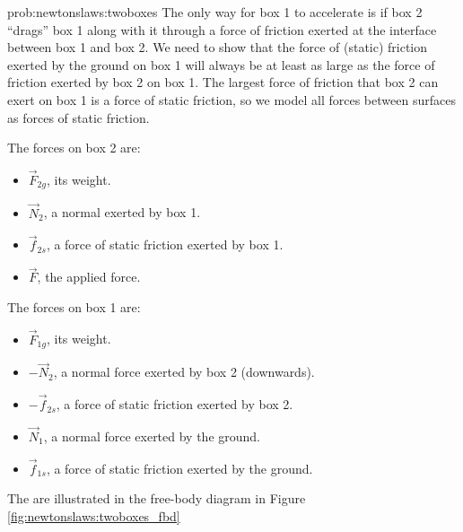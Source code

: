 \begin{solution}{prob:newtonslaws:twoboxes}\label{soln:newtonslaws:twoboxes}
The only way for box 1 to accelerate is if box 2 ``drags'' box 1 along with it through a force of friction exerted at the interface between box 1 and box 2. We need to show that the force of (static) friction exerted by the ground on box 1 will always be at least as large as the force of friction exerted by box 2 on box 1. The largest force of friction that box 2 can exert on box 1 is a force of static friction, so we model all forces between surfaces as forces of static friction. 

The forces on box 2 are:
\begin{itemize}
\item $\vec F_{2g}$, its weight.
\item $\vec N_2$, a normal exerted by box 1. 
\item $\vec f_{2s}$, a force of static friction exerted by box 1. 
\item $\vec F$, the applied force.
\end{itemize}
The forces on box 1 are:
\begin{itemize}
\item $\vec F_{1g}$, its weight.
\item $-\vec N_2$, a normal force exerted by box 2 (downwards).
\item $-\vec f_{2s}$, a force of static friction exerted by box 2. 
\item $\vec N_1$, a normal force exerted by the ground.
\item $\vec f_{1s}$, a force of static friction exerted by the ground. 
\end{itemize}
The are illustrated in the free-body diagram in Figure \ref{fig:newtonslaws:twoboxes_fbd}


\end{solution}
